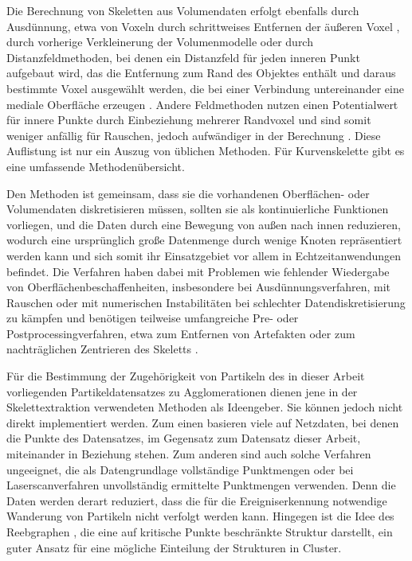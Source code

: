 Die Berechnung von Skeletten aus Volumendaten erfolgt ebenfalls durch Ausdünnung, etwa von Voxeln durch schrittweises Entfernen der äußeren Voxel \cite{ma2002TopologyPreservingReduction}, durch vorherige Verkleinerung der Volumenmodelle \cite{wang2008curveSkeletonExtraction} oder durch Distanzfeldmethoden, bei denen ein Distanzfeld für jeden inneren Punkt aufgebaut wird, das die Entfernung zum Rand des Objektes enthält und daraus bestimmte Voxel ausgewählt werden, die bei einer Verbindung untereinander eine mediale Oberfläche erzeugen \cite{hassouna2005robustCenterlineExtraction}. Andere Feldmethoden nutzen einen Potentialwert für innere Punkte durch Einbeziehung mehrerer Randvoxel und sind somit weniger anfällig für Rauschen, jedoch aufwändiger in der Berechnung \cite{cornea2005hierarchicalCurveSkeletons}. Diese Auflistung ist nur ein Auszug von üblichen Methoden. Für Kurvenskelette \cite{cornea2007curveSkeletonProperties} gibt es eine umfassende Methodenübersicht.

Den Methoden ist gemeinsam, dass sie die vorhandenen Oberflächen- oder Volumendaten diskretisieren müssen, sollten sie als kontinuierliche Funktionen vorliegen, und die Daten durch eine Bewegung von außen nach innen reduzieren, wodurch eine ursprünglich große Datenmenge durch wenige Knoten repräsentiert werden kann und sich somit ihr Einsatzgebiet vor allem in Echtzeitanwendungen befindet. Die Verfahren haben dabei mit Problemen wie fehlender Wiedergabe von Oberflächenbeschaffenheiten, insbesondere bei Ausdünnungsverfahren, mit Rauschen oder mit numerischen Instabilitäten bei schlechter Datendiskretisierung zu kämpfen und benötigen teilweise umfangreiche Pre- oder Postprocessingverfahren, etwa zum Entfernen von Artefakten oder zum nachträglichen Zentrieren des Skeletts \cite{cornea2007curveSkeletonProperties}.


Für die Bestimmung der Zugehörigkeit von Partikeln des in dieser Arbeit vorliegenden Partikeldatensatzes zu Agglomerationen dienen jene in der Skelettextraktion verwendeten Methoden als Ideengeber. Sie können jedoch nicht direkt implementiert werden. Zum einen basieren viele auf Netzdaten, bei denen die Punkte des Datensatzes, im Gegensatz zum Datensatz dieser Arbeit, miteinander in Beziehung stehen. Zum anderen sind auch solche Verfahren ungeeignet, die als Datengrundlage vollständige Punktmengen \cite{wang2008curveSkeletonExtraction} \cite{sharf2007onTheFlyCurveSkeleton} oder bei Laserscanverfahren unvollständig ermittelte Punktmengen \cite{tagliasacchi2009curveIncompletePointCloud} verwenden. Denn die Daten werden derart reduziert, dass die für die Ereigniserkennung notwendige Wanderung von Partikeln nicht verfolgt werden kann. Hingegen ist die Idee des Reebgraphen \cite{pascucci2007computationReebGraph}, die eine auf kritische Punkte beschränkte Struktur darstellt, ein guter Ansatz für eine mögliche Einteilung der Strukturen in Cluster.

